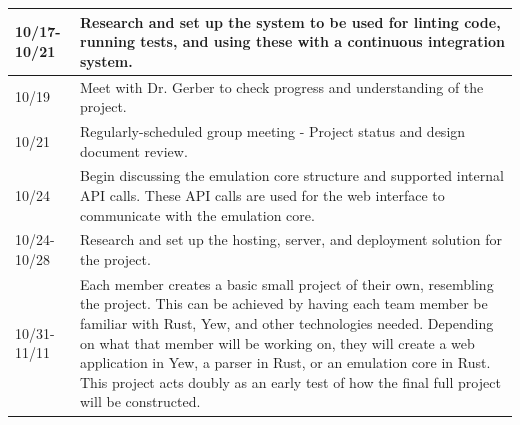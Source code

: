 \documentclass[
    paper=letter,
    parskip=half,
    fontsize=12pt,
    titlepage=firstiscover,
    toc=bibliography,
    numbers=endperiod
]{scrartcl}
\begin{document}
{\begin{tabularx}{\textwidth}{|l|X|}
        10/17-10/21   & Research and set up the system to be used for linting code, running tests, and using these with a continuous integration system.                                                                                                                                                                                                                                                                                                     \\\hline
        10/19         & Meet with Dr. Gerber to check progress and understanding of the project.                                                                                                                                                                                                                                                                                                                                                             \\\hline
        10/21         & Regularly-scheduled group meeting - Project status and design document review.                                                                                                                                                                                                                                                                                                                                                       \\\hline
        10/24         & Begin discussing the emulation core structure and supported internal API calls. These API calls are used for the web interface to communicate with the emulation core.                                                                                                                                                                                                                                                               \\\hline
        10/24-10/28   & Research and set up the hosting, server, and deployment solution for the project.                                                                                                                                                                                                                                                                                                                                                    \\\hline
        10/31-11/11   & Each member creates a basic small project of their own, resembling the project. This can be achieved by having each team member be familiar with Rust, Yew, and other technologies needed. Depending on what that member will be working on, they will create a web application in Yew, a parser in Rust, or an emulation core in Rust. This project acts doubly as an early test of how the final full project will be constructed. \\\hline

\end{tabularx}}
\end{document}

